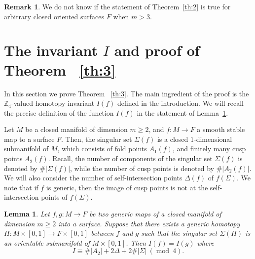\documentclass[12pt]{amsart}
\def \Z{\mathbb{Z}}
\def\co{\colon}
\def\mod{{\mathop\mathrm{mod}\ }}
\newtheorem{lemma}[theorem]{Lemma}
\theoremstyle{definition}
\newtheorem{remark}[theorem]{Remark}
\begin{document}
{ \begin{remark} We do not know if the statement of Theorem~\ref{th:2} is true for arbitrary closed oriented surfaces $F$ when $m>3$. 
 \end{remark}
 
\section{The invariant $I$ and proof of Theorem ~\ref{th:3}}

In this section we prove Theorem ~\ref{th:3}. The main ingredient of the proof is the $\Z_4$-valued homotopy invariant $I(f)$ defined in the introduction. We will recall the precise definition of the function $I(f)$ in the statement of Lemma~\ref{lem:inv}.



Let $M$ be a closed manifold of dimension $m\ge 2$, and $f\co M\to F$ a smooth stable map to a surface $F$. Then, the singular set $\Sigma(f)$ is a closed $1$-dimensional submanifold of $M$,  which consists of fold points $A_1(f)$, and finitely many cusp points $A_2(f)$.  Recall, the number of components of the singular set $\Sigma(f)$ is denoted by $\#|\Sigma(f)|$, while the number of cusp points is denoted by $\#|A_2(f)|$. We will also consider the number of self-intersection points $\Delta(f)$ of $f(\Sigma)$. We note that if $f$ is generic, then the image of cusp points is not at the self-intersection points of $f(\Sigma)$.  


\begin{lemma}\label{lem:inv} Let $f, g\co M\to F$ be two generic maps of a closed manifold of dimension $m\ge 2$ into a surface. Suppose that there exists a generic homotopy $H\co M\times [0,1]\to F\times [0,1]$ between $f$ and $g$ such that the singular set $\Sigma(H)$ is an orientable submanifold of $M\times [0,1]$. Then $I(f)=I(g)$ where 
\[
     I \equiv \#|A_2| + 2\Delta +  2\#|\Sigma| \ (\mod 4).
\]
\end{lemma}


}
\end{document}
